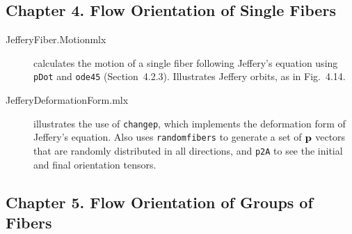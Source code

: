 \documentclass[11pt]{article}
\begin{document}
\subsection*{Chapter 4. Flow Orientation of Single Fibers}

\begin{description}

    \item[JefferyFiber.Motionmlx]{calculates the motion of a single fiber following Jeffery's equation using \texttt{pDot} and \texttt{ode45} (Section~4.2.3).  Illustrates Jeffery orbits, as in Fig.~4.14.}

    \item[JefferyDeformationForm.mlx]{illustrates the use of \texttt{changep}, which implements the deformation form of Jeffery's equation.  Also uses \texttt{randomfibers} to generate a set of $\mathbf{p}$ vectors that are randomly distributed in all directions, and \texttt{p2A} to see the initial and final orientation tensors.}
        
\end{description}


\subsection*{Chapter 5. Flow Orientation of Groups of Fibers} 
\end{document}
